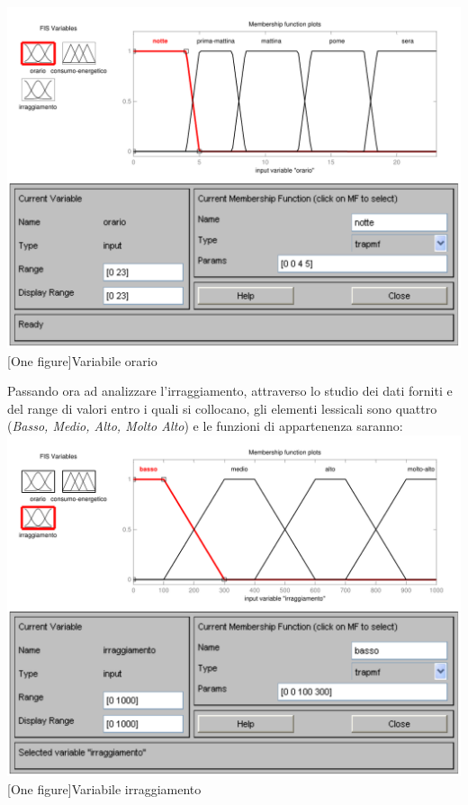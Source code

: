 \vspace{20px}
\includegraphics[scale=0.5]{images/fuzzy/variabile_orario.pdf}
[One figure]{Variabile orario}
\vspace{20px}

Passando ora ad analizzare l'irraggiamento, attraverso lo studio dei dati forniti e del range di valori entro i quali si collocano, gli elementi lessicali sono quattro ({\em Basso, Medio, Alto, Molto Alto}) e le funzioni di appartenenza saranno:\\

\vspace{20px}
\includegraphics[scale=0.5]{images/fuzzy/variabile_irraggiamento.pdf}
[One figure]{Variabile irraggiamento}
\vspace{20px}

